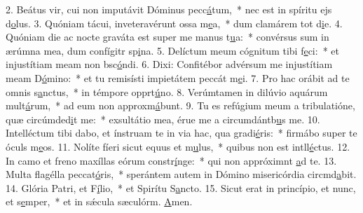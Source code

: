2. Beátus vir, cui non imputávit Dóminus pecc\uline{á}tum,~* nec est in spíritu ejs d\uline{o}lus.
3. Quóniam tácui, inveteravérunt ossa m\uline{e}a,~* dum clamárem tot d\uline{i}e.
4. Quóniam die ac nocte graváta est super me manus t\uline{u}a:~* convérsus sum in ærúmna mea, dum confígitr sp\uline{i}na.
5. Delíctum meum cógnitum tibi f\uline{e}ci:~* et injustítiam meam non bsc\uline{ó}ndi.
6. Dixi: Confitébor advérsum me injustítiam meam D\uline{ó}mino:~* et tu remisísti impietátem peccát m\uline{e}i.
7. Pro hac orábit ad te omnis s\uline{a}nctus,~* in témpore opprt\uline{ú}no.
8. Verúmtamen in dilúvio aquárum mult\uline{á}rum,~* ad eum non approxm\uline{á}bunt.
9. Tu es refúgium meum a tribulatióne, quæ circúmded\uline{i}t me:~* exsultátio mea, érue me a circumdántb\uline{u}s me.
10. Intelléctum tibi dabo, et ínstruam te in via hac, qua gradi\uline{é}ris:~* firmábo super te óculs m\uline{e}os.
11. Nolíte fíeri sicut equus et m\uline{u}lus,~* quibus non est intll\uline{é}ctus.
12. In camo et freno maxíllas eórum constr\uline{í}nge:~* qui non appróximnt \uline{a}d te.
13. Multa flagélla peccat\uline{ó}ris,~* sperántem autem in Dómino misericórdia circmd\uline{a}bit.
14. Glória Patri, et F\uline{í}lio,~* et Spirítu S\uline{a}ncto.
15. Sicut erat in princípio, et nunc, et s\uline{e}mper,~* et in sǽcula sæculórm. \uline{A}men.
